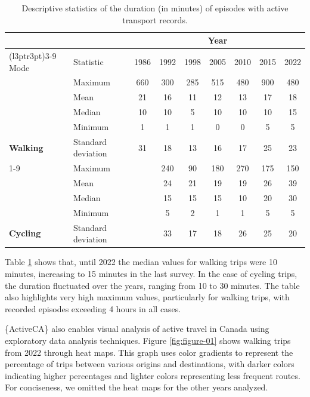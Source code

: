 \documentclass[Royal,times,sageh]{sagej}
\begin{document}
\begin{table}
\centering
\caption{\label{tab:table-01}\label{tab:table-01}Descriptive statistics of the duration (in minutes) of episodes with active transport records.}
\centering
\fontsize{8}{10}\selectfont
\begin{tabular}[t]{>{}llccccccc}
\toprule
\multicolumn{2}{c}{ } & \multicolumn{7}{c}{Year} \\
\cmidrule(l{3pt}r{3pt}){3-9}
Mode & Statistic & 1986 & 1992 & 1998 & 2005 & 2010 & 2015 & 2022\\
\midrule
 & Maximum & 660 & 300 & 285 & 515 & 480 & 900 & 480\\

 & Mean & 21 & 16 & 11 & 12 & 13 & 17 & 18\\

 & Median & 10 & 10 & 5 & 10 & 10 & 10 & 15\\

 & Minimum & 1 & 1 & 1 & 0 & 0 & 5 & 5\\

\multirow[t]{-5}{*}{\raggedright\arraybackslash \textbf{Walking}} & Standard deviation & 31 & 18 & 13 & 16 & 17 & 25 & 23\\
\cmidrule{1-9}
 & Maximum &  & 240 & 90 & 180 & 270 & 175 & 150\\

 & Mean &  & 24 & 21 & 19 & 19 & 26 & 39\\

 & Median &  & 15 & 15 & 15 & 10 & 20 & 30\\

 & Minimum &  & 5 & 2 & 1 & 1 & 5 & 5\\

\multirow[t]{-5}{*}{\raggedright\arraybackslash \textbf{Cycling}} & Standard deviation &  & 33 & 17 & 18 & 26 & 25 & 20\\
\bottomrule
\end{tabular}
\end{table}

Table \ref{tab:table-01} shows that, until 2022 the median values for
walking trips were 10 minutes, increasing to 15 minutes in the last
survey. In the case of cycling trips, the duration fluctuated over the
years, ranging from 10 to 30 minutes. The table also highlights very
high maximum values, particularly for walking trips, with recorded
episodes exceeding 4 hours in all cases.

\{ActiveCA\} also enables visual analysis of active travel in Canada
using exploratory data analysis techniques. Figure \ref{fig:figure-01}
shows walking trips from 2022 through heat maps. This graph uses color
gradients to represent the percentage of trips between various origins
and destinations, with darker colors indicating higher percentages and
lighter colors representing less frequent routes. For conciseness, we
omitted the heat maps for the other years analyzed.
\end{document}
